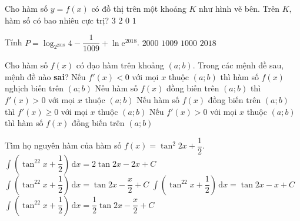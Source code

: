\begin{ex}%
\immini
{
Cho hàm số $y=f(x)$ có đồ thị trên một khoảng $K$ như hình vẽ bên. Trên $K,$ hàm số có bao nhiêu cực trị?
\choice
{$3$}
{\True $2$}
{$0$}
{$1$}
}
{
}
\end{ex}

\begin{ex}%
Tính $P=\log_{2^{2018}}4-\dfrac{1}{1009}+\ln\mathrm{e}^{2018}$.
\choice
{$2000$}
{$1009$}
{$1000$}
{\True $2018$}
\end{ex}

\begin{ex}%
Cho hàm số $f(x)$ có đạo hàm trên khoảng $(a;b)$. Trong các mệnh đề sau, mệnh đề nào {\bf sai}?
\choice
{Nếu $f'(x)<0$ với mọi $x$ thuộc $(a;b)$ thì hàm số $f(x)$ nghịch biến trên $(a;b)$}
{\True Nếu hàm số $f(x)$ đồng biến trên $(a;b)$ thì $f'(x)>0$ với mọi $x$ thuộc $(a;b)$}
{Nếu hàm số $f(x)$ đồng biến trên $(a;b)$ thì $f'(x)\ge 0$ với mọi $x$ thuộc $(a;b)$}
{Nếu $f'(x)>0$ với mọi $x$ thuộc $(a;b)$ thì hàm số $f(x)$ đồng biến trên $(a;b)$}
\end{ex}

\begin{ex}%
Tìm họ nguyên hàm của hàm số $f(x)=\tan^2 2x+\dfrac{1}{2}.$
\choice
{$\displaystyle\int\left(\tan^22x+\dfrac{1}{2}\right) \mathrm{\,d}x=2\tan 2x-2x+C$}
{$\displaystyle\int\left(\tan^22x+\dfrac{1}{2}\right) \mathrm{\,d}x=\tan 2x-\dfrac{x}{2}+C$}
{$\displaystyle\int\left(\tan^22x+\dfrac{1}{2}\right) \mathrm{\,d}x=\tan 2x-x+C$}
{\True $\displaystyle\int\left(\tan^22x+\dfrac{1}{2}\right) \mathrm{\,d}x=\dfrac{1}{2}\tan 2x-\dfrac{x}{2}+C$}
\end{ex}

